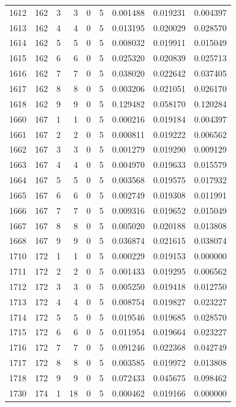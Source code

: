 \begin{longtable}{rrrrrrrrr}
1612 & 162 & 3 & 3 & 0 & 5 & 0.001488 & 0.019231 & 0.004397 \\
1613 & 162 & 4 & 4 & 0 & 5 & 0.013195 & 0.020029 & 0.028570 \\
1614 & 162 & 5 & 5 & 0 & 5 & 0.008032 & 0.019911 & 0.015049 \\
1615 & 162 & 6 & 6 & 0 & 5 & 0.025320 & 0.020839 & 0.025713 \\
1616 & 162 & 7 & 7 & 0 & 5 & 0.038020 & 0.022642 & 0.037405 \\
1617 & 162 & 8 & 8 & 0 & 5 & 0.003206 & 0.021051 & 0.026170 \\
1618 & 162 & 9 & 9 & 0 & 5 & 0.129482 & 0.058170 & 0.120284 \\
1660 & 167 & 1 & 1 & 0 & 5 & 0.000216 & 0.019184 & 0.004397 \\
1661 & 167 & 2 & 2 & 0 & 5 & 0.000811 & 0.019222 & 0.006562 \\
1662 & 167 & 3 & 3 & 0 & 5 & 0.001279 & 0.019290 & 0.009129 \\
1663 & 167 & 4 & 4 & 0 & 5 & 0.004970 & 0.019633 & 0.015579 \\
1664 & 167 & 5 & 5 & 0 & 5 & 0.003568 & 0.019575 & 0.017932 \\
1665 & 167 & 6 & 6 & 0 & 5 & 0.002749 & 0.019308 & 0.011991 \\
1666 & 167 & 7 & 7 & 0 & 5 & 0.009316 & 0.019652 & 0.015049 \\
1667 & 167 & 8 & 8 & 0 & 5 & 0.005020 & 0.020188 & 0.013808 \\
1668 & 167 & 9 & 9 & 0 & 5 & 0.036874 & 0.021615 & 0.038074 \\
1710 & 172 & 1 & 1 & 0 & 5 & 0.000229 & 0.019153 & 0.000000 \\
1711 & 172 & 2 & 2 & 0 & 5 & 0.001433 & 0.019295 & 0.006562 \\
1712 & 172 & 3 & 3 & 0 & 5 & 0.005250 & 0.019418 & 0.012750 \\
1713 & 172 & 4 & 4 & 0 & 5 & 0.008754 & 0.019827 & 0.023227 \\
1714 & 172 & 5 & 5 & 0 & 5 & 0.019546 & 0.019685 & 0.028570 \\
1715 & 172 & 6 & 6 & 0 & 5 & 0.011954 & 0.019664 & 0.023227 \\
1716 & 172 & 7 & 7 & 0 & 5 & 0.091246 & 0.022368 & 0.042749 \\
1717 & 172 & 8 & 8 & 0 & 5 & 0.003585 & 0.019972 & 0.013808 \\
1718 & 172 & 9 & 9 & 0 & 5 & 0.072433 & 0.045675 & 0.098462 \\
1730 & 174 & 1 & 18 & 0 & 5 & 0.000462 & 0.019166 & 0.000000 \\

\end{longtable}
